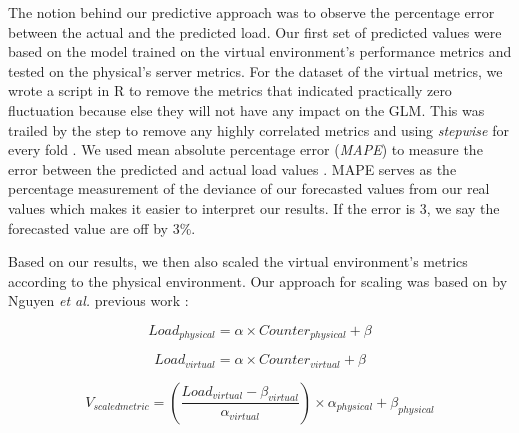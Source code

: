 	The notion behind our predictive approach was to observe the percentage error between the actual and the predicted load. Our first set of predicted values were based on the model trained on the virtual environment's performance metrics and tested on the physical's server metrics. For the dataset of the virtual metrics, we wrote a script in R to remove the metrics that indicated practically zero fluctuation because else they will not have any impact on the GLM. This was trailed by the step to remove any highly correlated metrics and using \textit{stepwise} for every fold \cite{Shihab:2010:UIC:1852786.1852792}. 
	We used mean absolute percentage error (\textit{MAPE}) to measure the error between the predicted and actual load values \cite{mape}. MAPE serves as the percentage measurement of the deviance of our forecasted values from our real values which makes it easier to interpret our results. If the error is 3, we say the forecasted value are off by 3\%. 
	
	Based on our results, we then also scaled the virtual environment's metrics according to the physical environment. Our approach for scaling was based on by Nguyen \textit{et al.} previous work \cite{Nguyen:2012:ADP:2188286.2188344}:
	
	\begin{equation*}
	Load_{physical}= \alpha \times Counter_{physical} + \beta
	\end{equation*}
	
	\begin{equation*}
	Load_{virtual}= \alpha \times Counter_{virtual} + \beta
	\end{equation*}
	
	\begin{equation}
	V_{scaledmetric} = (\frac{Load_{virtual}-\beta_{virtual}}{\alpha_{virtual}})\times\alpha_{physical}+\beta_{physical}
	\end{equation}
	
